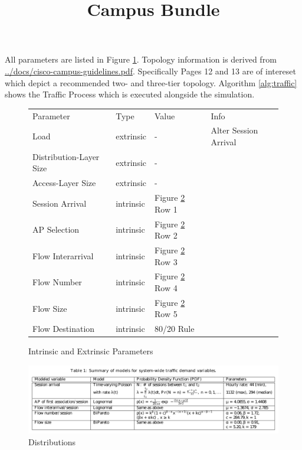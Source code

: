 \documentclass[a4paper]{article}
\title{Campus Bundle}
\author{}
\date{}
\begin{document}
\maketitle

All parameters are listed in Figure \ref{fig:params}. Topology information is derived from \url{../docs/cisco-campus-guidelines.pdf}. Specifically Pages 12 and 13 are of 
intereset which depict a recommended two- and three-tier topology. Algorithm \ref{alg:traffic} shows the Traffic Process which is executed alongside the simulation.

\begin{figure}
\begin{tabular}{llll}
Parameter & Type & Value & Info\\
Load & extrinsic & - &
Alter Session Arrival\\
Distribution-Layer Size & extrinsic & - & \\
Access-Layer Size & extrinsic & - & \\
Session Arrival & intrinsic & Figure \ref{fig:dists} Row 1 & \\
AP Selection & intrinsic & Figure \ref{fig:dists} Row 2 & \\
Flow Interarrival & intrinsic & Figure \ref{fig:dists} Row 3 & \\
Flow Number & intrinsic & Figure \ref{fig:dists} Row 4 & \\
Flow Size & intrinsic & Figure \ref{fig:dists} Row 5 & \\
Flow Destination & intrinsic & 80/20 Rule
\end{tabular}
\caption{Intrinsic and Extrinsic Parameters}
\label{fig:params}
\end{figure}

\begin{figure}
\includegraphics[width=\textwidth]{../docs/parameters-1}
\caption{Distributions}
\label{fig:dists}
\end{figure}
\end{document}
